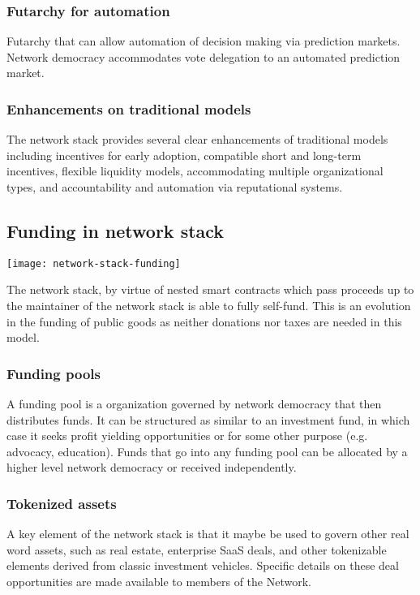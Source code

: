 \documentclass{article}
\begin{document}
\subsubsection {Futarchy for automation}

Futarchy that can allow automation of decision making via prediction markets. Network democracy accommodates vote delegation to an automated prediction market.

\subsubsection {Enhancements on traditional models}

The network stack provides several clear enhancements of traditional models including incentives for early adoption, compatible short and long-term incentives, flexible liquidity models, accommodating multiple organizational types, and accountability and automation via reputational systems.

\subsection {Funding in network stack}

\texttt{[image: network-stack-funding]}

The network stack, by virtue of nested smart contracts which pass proceeds up to the maintainer of the network stack is able to fully self-fund. This is an evolution in the funding of public goods as neither donations nor taxes are needed in this model.

\subsubsection {Funding pools}

A funding pool is a organization governed by network democracy that then distributes funds. It can be structured as similar to an investment fund, in which case it seeks profit yielding opportunities or for some other purpose (e.g. advocacy, education). Funds that go into any funding pool can be allocated by a higher level network democracy or received independently.

\subsubsection {Tokenized assets}

A key element of the network stack is that it maybe be used to govern  other real word assets, such as real estate, enterprise SaaS deals, and other tokenizable elements derived from classic investment vehicles. Specific details on these deal opportunities are made available to members of the Network.
\end{document}

